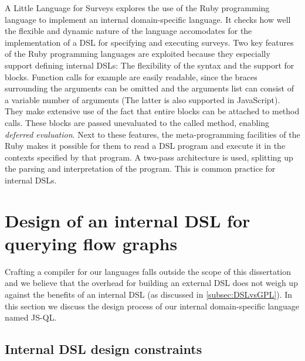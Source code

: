 A Little Language for Surveys \cite{RubyDSL} explores the use of the Ruby programming language to implement an internal domain-specific language. It checks how well the flexible and dynamic nature of the language accomodates for the implementation of a DSL for specifying and executing surveys. Two key features of the Ruby programming languages are exploited because they especially support defining internal DSLs: The flexibility of the syntax and the support for blocks. Function calls for example are easily readable, since the braces surrounding the arguments can be omitted and the arguments list can consist of a variable number of arguments (The latter is also supported in JavaScript\cite{Ecma6}). They make extensive use of the fact that entire blocks can be attached to method calls. These blocks are passed unevaluated to the called method, enabling \textit{deferred evaluation}. Next to these features, the meta-programming facilities of the Ruby makes it possible for them to read a DSL program and execute it in the contexts specified by that program. A two-pass architecture is used, splitting up the parsing and interpretation of the program. This is common practice for internal DSLs.

%


\section{Design of an internal DSL for querying flow graphs}

Crafting a compiler for our languages falls outside the scope of this dissertation and we believe that the overhead for building an external DSL does not weigh up against the benefits of an internal DSL (as discussed in \ref{subsec:DSLvsGPL}).
In this section we discuss the design process of our internal domain-specific language named JS-QL.

\subsection{Internal DSL design constraints}

